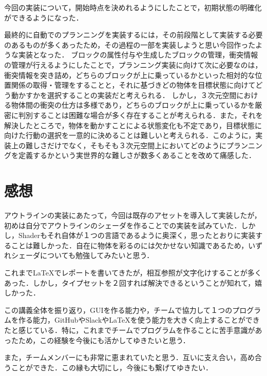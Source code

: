\documentclass[12pt]{jarticle}
\begin{document}
今回の実装について，開始時点を決めれるようにしたことで，初期状態の明確化ができるようになった．

最終的に自動でのプランニングを実装するには，その前段階として実装する必要のあるものが多くあったため，その過程の一部を実装しようと思い今回作ったような実装となった．
ブロックの属性付与や生成したブロックの管理，衝突情報の管理が行えるようにしたことで，プランニング実装に向けて次に必要なのは，衝突情報を突き詰め，どちらのブロックが上に乗っているかといった相対的な位置関係の取得・管理をすることと，それに基づきどの物体を目標状態に向けてどう動かすかを選択することの実装だと考えられる．
しかし，３次元空間における物体間の衝突の仕方は多様であり，どちらのブロックが上に乗っているかを厳密に判別することは困難な場合が多く存在することが考えられる．また，それを解決したところで，物体を動かすことによる状態変化も不定であり，目標状態に向けた行動の選択を一意的に決めることは難しいと考えられる．このように，実装上の難しさだけでなく，そもそも３次元空間上においてどのようにプランニングを定義するかという実世界的な難しさが数多くあることを改めて痛感した．

\section{感想}

アウトラインの実装にあたって，今回は既存のアセットを導入して実装したが，初めは自分でアウトラインのシェーダを作ることでの実装を試みていた．しかし，Shaderもそれ自体が１つの言語であるように奥深く，思ったとおりに実装することは難しかった．自在に物体を彩るのには欠かせない知識であるため，いずれシェーダについても勉強してみたいと思う．

これまでLaTeXでレポートを書いてきたが，相互参照が文字化けすることが多くあった．しかし，タイプセットを２回すれば解決できる\cite{latex}ということが知れて，嬉しかった．

この講義全体を振り返り，GUIを作る能力や，チームで協力して１つのプログラムを作る能力，GitHubやSlackやLaTeXを使う能力を大きく向上することができたと感じている．特に，これまでチームでプログラムを作ることに苦手意識があったため，この経験を今後にも活かしてゆきたいと思う．

また，チームメンバーにも非常に恵まれていたと思う．互いに支え合い，高め合うことができた．この縁も大切にし，今後にも繋げてゆきたい．
\end{document}
